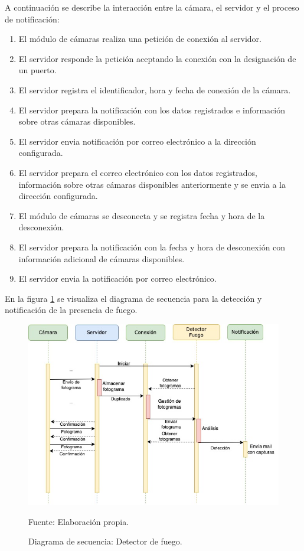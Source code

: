 A continuación se describe la interacción entre la cámara, el servidor y el proceso de notificación:
\begin{enumerate}
    \item El módulo de cámaras realiza una petición de conexión al servidor.
    \item El servidor responde la petición aceptando la conexión con la designación de un puerto.
    \item El servidor registra el identificador, hora y fecha de conexión de la cámara.
    \item El servidor prepara la notificación con los datos registrados e información sobre otras cámaras disponibles.
    \item El servidor envia notificación por correo electrónico a la dirección configurada.
    \item El servidor prepara el correo electrónico con los datos registrados, información sobre otras cámaras disponibles anteriormente y se envia a la dirección configurada.
    \item El módulo de cámaras se desconecta y se registra fecha y hora de la desconexión.
    \item El servidor prepara la notificación con la fecha y hora de desconexión con información adicional de cámaras disponibles.
    \item El servidor envia la notificación por correo electrónico.
\end{enumerate}

En la figura \ref{fig:diag_sec_dec_fuego} se visualiza el diagrama de secuencia para la detección y notificación de la presencia de fuego.

\begin{figure}[H]
    \begin{center}
        \includegraphics[width=14cm]{img/capitulo_4/fire_detector.jpg}
    \end{center}
    \begin{center}
        \caption{Diagrama de secuencia: Detector de fuego.}
        Fuente: Elaboración propia.
        \label{fig:diag_sec_dec_fuego}
    \end{center}
\end{figure}

